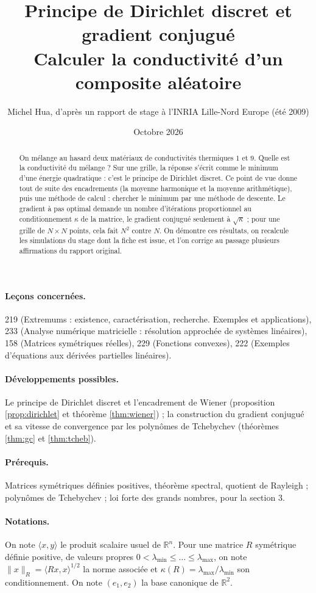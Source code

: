 \documentclass[11pt,a4paper]{article}
\title{Principe de Dirichlet discret et gradient conjugué\\[2pt]
\large Calculer la conductivité d'un composite aléatoire}
\author{Michel Hua, d'après un rapport de stage à l'INRIA Lille-Nord Europe (été 2009)}
\date{Octobre 2026}
\theoremstyle{plain}
\theoremstyle{definition}
\theoremstyle{remark}
\newcommand{\R}{\mathbb{R}}
\newcommand{\ps}[2]{\langle #1,#2\rangle}
\begin{document}
\maketitle

\begin{abstract}
On mélange au hasard deux matériaux de conductivités thermiques $1$ et $9$. Quelle est la conductivité du mélange ? Sur une grille, la réponse s'écrit comme le minimum d'une énergie quadratique : c'est le principe de Dirichlet discret. Ce point de vue donne tout de suite des encadrements (la moyenne harmonique et la moyenne arithmétique), puis une méthode de calcul : chercher le minimum par une méthode de descente. Le gradient à pas optimal demande un nombre d'itérations proportionnel au conditionnement $\kappa$ de la matrice, le gradient conjugué seulement à $\sqrt\kappa$ ; pour une grille de $N\times N$ points, cela fait $N^2$ contre $N$. On démontre ces résultats, on recalcule les simulations du stage dont la fiche est issue, et l'on corrige au passage plusieurs affirmations du rapport original.
\end{abstract}

\paragraph{Leçons concernées.} 219 (Extremums : existence, caractérisation, recherche. Exemples et applications), 233 (Analyse numérique matricielle : résolution approchée de systèmes linéaires), 158 (Matrices symétriques réelles), 229 (Fonctions convexes), 222 (Exemples d'équations aux dérivées partielles linéaires).

\paragraph{Développements possibles.} Le principe de Dirichlet discret et l'encadrement de Wiener (proposition \ref{prop:dirichlet} et théorème \ref{thm:wiener}) ; la construction du gradient conjugué et sa vitesse de convergence par les polynômes de Tchebychev (théorèmes \ref{thm:gc} et \ref{thm:tcheb}).

\paragraph{Prérequis.} Matrices symétriques définies positives, théorème spectral, quotient de Rayleigh ; polynômes de Tchebychev ; loi forte des grands nombres, pour la section 3.

\paragraph{Notations.} On note $\ps{x}{y}$ le produit scalaire usuel de $\R^n$. Pour une matrice $R$ symétrique définie positive, de valeurs propres $0<\lambda_{\min}\leq\dots\leq\lambda_{\max}$, on note $\|x\|_R=\ps{Rx}{x}^{1/2}$ la norme associée et $\kappa(R)=\lambda_{\max}/\lambda_{\min}$ son conditionnement. On note $(e_1,e_2)$ la base canonique de $\R^2$.
\end{document}
